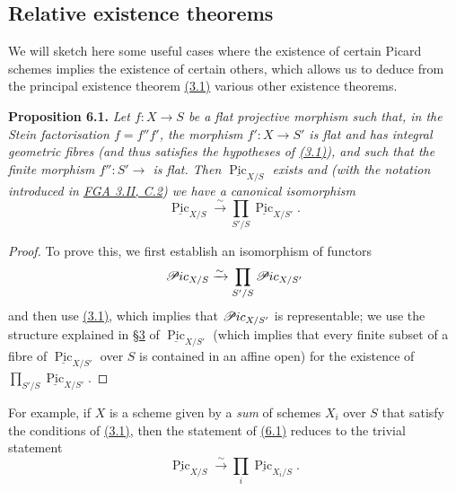 \documentclass{article}
\newenvironment{itenv}[1]
  {\phantomsection\par\smallskip\noindent\textbf{#1.}\itshape}
  {\par\smallskip}
\theoremstyle{definition}
\theoremstyle{definition}
\theoremstyle{definition}
\theoremstyle{definition}
\theoremstyle{remark}
\begin{document}
\hypertarget{fga-3-v-section-6}{%
\subsection{Relative existence theorems}\label{fga-3-v-section-6}}

We will sketch here some useful cases where the existence of certain Picard schemes implies the existence of certain others, which allows us to deduce from the principal existence theorem \protect\hyperlink{fga-3-v-theorem-3.1}{(3.1)} various other existence theorems.

\leavevmode{}%
\begin{itenv}{Proposition 6.1}
Let \(f\colon X\to S\) be a flat projective morphism such that, in the Stein factorisation \(f=f''f'\), the morphism \(f'\colon X\to S'\) is \emph{flat} and has integral geometric fibres (and thus satisfies the hypotheses of \protect\hyperlink{fga-3-v-theorem-3.1}{(3.1)}), and such that the finite morphism \(f''\colon S'\to\) is flat.
Then \(\underline{\operatorname{Pic}}_{X/S}\) exists and (with the notation introduced in \protect\hyperlink{fga-3-ii-section-C.2}{FGA 3.II, C.2}) we have a canonical isomorphism
\[
  \underline{\operatorname{Pic}}_{X/S}
  \xrightarrow{\sim}\prod_{S'/S} \underline{\operatorname{Pic}}_{X/S'}.
\]

\end{itenv}

\begin{proof}
To prove this, we first establish an isomorphism of functors
\[
  \mathscr{P}\kern -.5pt ic_{X/S}
  \xrightarrow{\sim}\prod_{S'/S} \mathscr{P}\kern -.5pt ic_{X/S'}
\]
and then use \protect\hyperlink{fga-3-v-theorem-3.1}{(3.1)}, which implies that \(\mathscr{P}\kern -.5pt ic_{X/S'}\) is representable;
we use the structure explained in \protect\hyperlink{fga-3-v-section-3}{§3} of \(\underline{\operatorname{Pic}}_{X/S'}\) (which implies that every finite subset of a fibre of \(\underline{\operatorname{Pic}}_{X/S'}\) over \(S\) is contained in an affine open) for the existence of \(\prod_{S'/S}\underline{\operatorname{Pic}}_{X/S'}\).
\end{proof}

For example, if \(X\) is a scheme given by a \emph{sum} of schemes \(X_i\) over \(S\) that satisfy the conditions of \protect\hyperlink{fga-3-v-theorem-3.1}{(3.1)}, then the statement of \protect\hyperlink{fga-3-v-proposition-6.1}{(6.1)} reduces to the trivial statement
\[
  \underline{\operatorname{Pic}}_{X/S}
  \xrightarrow{\sim}\prod_i \underline{\operatorname{Pic}}_{X_i/S}.
\]
\end{document}

